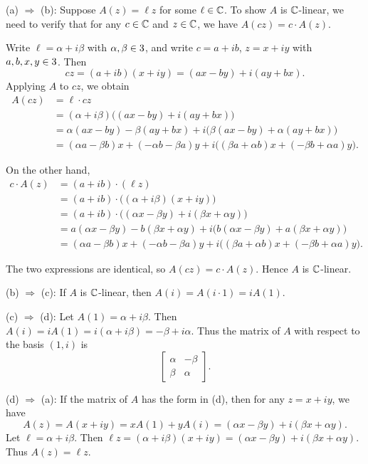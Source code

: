 \documentclass{article}
\begin{document}
\begin{solution}
  (a) $\Rightarrow$ (b): Suppose $A(z) = \ell z$ for some $\ell \in \mathbb{C}$.
  To show $A$ is $\mathbb{C}$-linear, we need to verify that for any
  $c \in \mathbb{C}$ and $z \in \mathbb{C}$, we have $A(cz) = c \cdot A(z)$.

  Write $\ell = \alpha + i\beta$ with $\alpha, \beta \in 3$, and
  write $c = a + ib$, $z = x + iy$ with $a, b, x, y \in 3$. Then
  \[
    cz = (a+ib)(x+iy) = (ax - by) + i(ay + bx).
  \]
  Applying $A$ to $cz$, we obtain
  \[
    \begin{aligned}
      A(cz) &= \ell \cdot cz \\
      &= (\alpha + i\beta)\big((ax - by) + i(ay + bx)\big) \\
      &= \alpha(ax - by) - \beta(ay + bx)
      + i\big(\beta(ax - by) + \alpha(ay + bx)\big) \\
      &= (\alpha a - \beta b)x + (-\alpha b - \beta a)y
      + i\big((\beta a + \alpha b)x + (-\beta b + \alpha a)y\big).
    \end{aligned}
  \]

  On the other hand,
  \[
    \begin{aligned}
      c \cdot A(z) &= (a + ib) \cdot (\ell z) \\
      &= (a + ib) \cdot \big((\alpha + i\beta)(x + iy)\big) \\
      &= (a + ib) \cdot \big((\alpha x - \beta y) + i(\beta x +
      \alpha y)\big) \\
      &= a(\alpha x - \beta y) - b(\beta x + \alpha y)
      + i\big(b(\alpha x - \beta y) + a(\beta x + \alpha y)\big) \\
      &= (\alpha a - \beta b)x + (-\alpha b - \beta a)y
      + i\big((\beta a + \alpha b)x + (-\beta b + \alpha a)y\big).
    \end{aligned}
  \]

  The two expressions are identical, so $A(cz) = c \cdot A(z)$.
  Hence $A$ is $\mathbb{C}$-linear.

  (b) $\Rightarrow$ (c): If $A$ is $\mathbb{C}$-linear, then $A(i) = A(i \cdot 1) =
  i A(1)$.

  (c) $\Rightarrow$ (d): Let $A(1) = \alpha + i\beta$. Then $A(i) = iA(1)
  = i(\alpha + i\beta) = -\beta + i\alpha$. Thus the matrix of $A$ with
  respect to the basis $(1, i)$ is
  \[
    \begin{bmatrix}
      \alpha & -\beta \\
      \beta & \alpha
    \end{bmatrix}.
  \]

  (d) $\Rightarrow$ (a): If the matrix of $A$ has the form in (d), then
  for any $z = x + iy$, we have
  \[
    A(z) = A(x + iy) = xA(1) + yA(i) = (\alpha x - \beta y) + i(\beta x +
    \alpha y).
  \]
  Let $\ell = \alpha + i\beta$. Then $\ell z = (\alpha + i\beta)(x + iy)
  = (\alpha x - \beta y) + i(\beta x + \alpha y)$. Thus $A(z) = \ell z$.
\end{solution}
\end{document}
